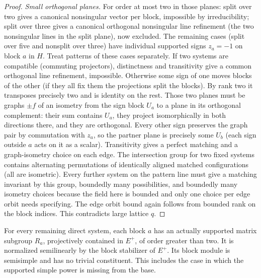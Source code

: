 \begin{proof}
\textit{Small orthogonal planes.} For order at most two in those planes: split over two gives a canonical nonsingular vector per block, impossible by irreducibility; split over three gives a canonical orthogonal nonsingular line refinement (the two nonsingular lines in the split plane), now excluded. The remaining cases (split over five and nonsplit over three) have individual supported signs \(z_a=-1\) on block \(a\) in \(H\). Treat patterns of these cases separately. If two systems are compatible (commuting projectors), distinctness and transitivity give a common orthogonal line refinement, impossible. Otherwise some sign of one moves blocks of the other (if they all fix them the projections split the blocks). By rank two it transposes precisely two and is identity on the rest. Those two planes must be graphs \(\pm f\) of an isometry from the sign block \(U_a\) to a plane in its orthogonal complement: their sum contains \(U_a\), they project isomorphically in both directions there, and they are orthogonal. Every other sign preserves the graph pair by commutation with \(z_a\), so the partner plane is precisely some \(U_b\) (each sign outside \(a\) acts on it as a scalar). Transitivity gives a perfect matching and a graph-isometry choice on each edge. The intersection group for two fixed systems contains alternating permutations of identically aligned matched configurations (all are isometric). Every further system on the pattern line must give a matching invariant by this group, boundedly many possibilities, and boundedly many isometry choices because the field here is bounded and only one choice per edge orbit needs specifying. The edge orbit bound again follows from bounded rank on the block indices. This contradicts large lattice \(q\).
\end{proof}

\begin{lemma}\label{c:supported-anchor-groups}
For every remaining direct system, each block \(a\) has an actually supported matrix subgroup \(R_a\), projectively contained in \(E^+\), of order greater than two. It is normalized semilinearly by the block stabilizer of \(E^+\). Its block module is semisimple and has no trivial constituent. This includes the case in which the supported simple power is missing from the base.
\end{lemma}

